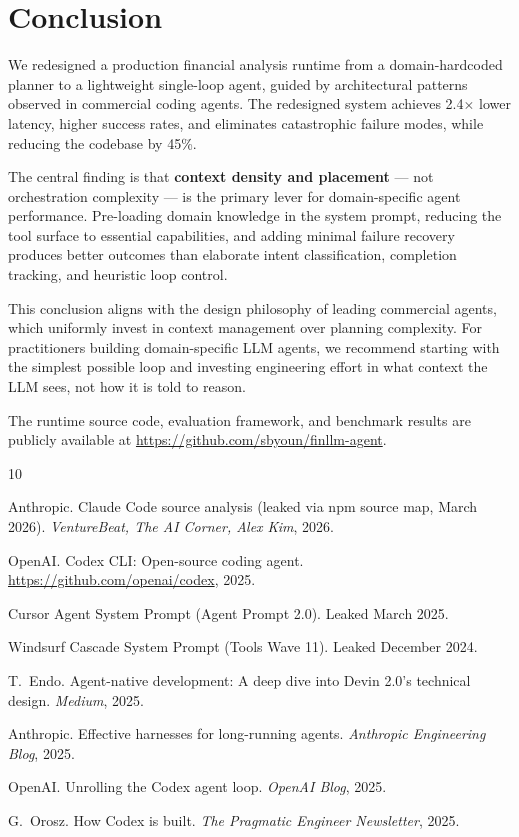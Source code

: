 \documentclass{article}
\begin{document}
\section{Conclusion}

We redesigned a production financial analysis runtime from a domain-hardcoded planner to a lightweight single-loop agent, guided by architectural patterns observed in commercial coding agents.
The redesigned system achieves 2.4$\times$ lower latency, higher success rates, and eliminates catastrophic failure modes, while reducing the codebase by 45\%.

The central finding is that \textbf{context density and placement} --- not orchestration complexity --- is the primary lever for domain-specific agent performance.
Pre-loading domain knowledge in the system prompt, reducing the tool surface to essential capabilities, and adding minimal failure recovery produces better outcomes than elaborate intent classification, completion tracking, and heuristic loop control.

This conclusion aligns with the design philosophy of leading commercial agents, which uniformly invest in context management over planning complexity.
For practitioners building domain-specific LLM agents, we recommend starting with the simplest possible loop and investing engineering effort in what context the LLM sees, not how it is told to reason.

The runtime source code, evaluation framework, and benchmark results are publicly available at \url{https://github.com/sbyoun/finllm-agent}.

\begin{thebibliography}{10}

Anthropic.
Claude Code source analysis (leaked via npm source map, March 2026).
\textit{VentureBeat, The AI Corner, Alex Kim}, 2026.

OpenAI.
Codex CLI: Open-source coding agent.
\url{https://github.com/openai/codex}, 2025.

Cursor Agent System Prompt (Agent Prompt 2.0).
Leaked March 2025.

Windsurf Cascade System Prompt (Tools Wave 11).
Leaked December 2024.

T.~Endo.
Agent-native development: A deep dive into Devin 2.0's technical design.
\textit{Medium}, 2025.

Anthropic.
Effective harnesses for long-running agents.
\textit{Anthropic Engineering Blog}, 2025.

OpenAI.
Unrolling the Codex agent loop.
\textit{OpenAI Blog}, 2025.

G.~Orosz.
How Codex is built.
\textit{The Pragmatic Engineer Newsletter}, 2025.

\end{thebibliography}
\end{document}
